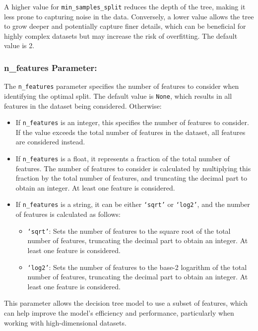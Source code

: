 \documentclass{article}
\begin{document}
A higher value for \texttt{min\_samples\_split} reduces the depth of the tree, making it less prone to capturing noise in the data. Conversely, a lower value allows the tree to grow deeper and potentially capture finer details, which can be beneficial for highly complex datasets but may increase the risk of overfitting. The default value is 2.

\subsubsection*{n\_features Parameter:}

The \texttt{n\_features} parameter specifies the number of features to consider when identifying the optimal split. The default value is \texttt{None}, which results in all features in the dataset being considered. Otherwise:

\begin{itemize}
    \item If \texttt{n\_features} is an integer, this specifies the number of features to consider. If the value exceeds the total number of features in the dataset, all features are considered instead.
    \item If \texttt{n\_features} is a float, it represents a fraction of the total number of features. The number of features to consider is calculated by multiplying this fraction by the total number of features, and truncating the decimal part to obtain an integer. At least one feature is considered.
    \item If \texttt{n\_features} is a string, it can be either \texttt{`sqrt'} or \texttt{`log2'}, and the number of features is calculated as follows:
    \begin{itemize}
        \item \texttt{`sqrt'}: Sets the number of features to the square root of the total number of features, truncating the decimal part to obtain an integer. At least one feature is considered.
        \item \texttt{`log2'}: Sets the number of features to the base-2 logarithm of the total number of features, truncating the decimal part to obtain an integer. At least one feature is considered.
    \end{itemize}
\end{itemize}

This parameter allows the decision tree model to use a subset of features, which can help improve the model’s efficiency and performance, particularly when working with high-dimensional datasets.
\end{document}
